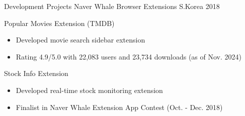 \begin{cventries}
\cventry
  {Development Projects} %
  {Naver Whale Browser Extensions} %
  {S.Korea} %
  {2018} %
  {
    \begin{cvitems}
      \item {Popular Movies Extension (TMDB)}
      \begin{itemize}
        \item {Developed movie search sidebar extension}
        \item {Rating 4.9/5.0 with 22,083 users and 23,734 downloads (as of Nov. 2024)}
      \end{itemize}
      \item {Stock Info Extension}
      \begin{itemize}
        \item {Developed real-time stock monitoring extension}
        \item {Finalist in Naver Whale Extension App Contest (Oct. - Dec. 2018)}
      \end{itemize}
    \end{cvitems}
  }

\end{cventries}